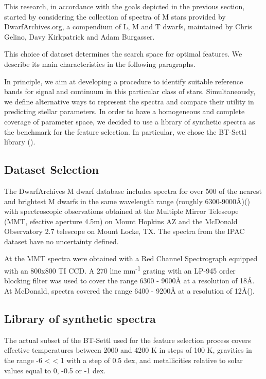 This research, in accordance with the goals depicted in the previous
  section, started by considering the collection of spectra of M stars
  provided by DwarfArchives.org, a compendium of L, M and T dwarfs,
  maintained by Chris Gelino, Davy Kirkpatrick and Adam Burgasser.

This choice of dataset determines the search space for optimal
features. We describe its main characteristics in the following
paragraphs.

In principle, we aim at developing a procedure to identify suitable
reference bands for signal and continuum in this particular class of
stars. Simultaneously, we define alternative ways to represent the
spectra and compare their utility in predicting stellar parameters. In
order to have a homogeneous and complete coverage of parameter space,
we decided to use a library of synthetic spectra as the benchmark for
the feature selection. In particular, we chose the BT-Settl library
(\cite{2013MSAIS..24..128A}). 

\subsection{Dataset Selection}
\label{subsec:DS}
 The DwarfArchives M dwarf database includes spectra for over 500 of
  the nearest and brightest M dwarfs in the same wavelength range
  (roughly 6300-9000{\AA})(\cite{Kirkpatrick:2002eh}) with
  spectroscopic observations obtained at the Multiple Mirror Telescope
  (MMT, efective aperture 4.5m) on Mount Hopkins AZ and the McDonald
  Observatory 2.7 telescope on Mount Locke, TX. The spectra from the
  IPAC dataset have no uncertainty defined.

 At the MMT spectra were obtained with a Red Channel Spectrograph
  equipped with an 800x800 TI CCD. A 270 line mm\textsuperscript{-1}
  grating with an LP-945 order blocking filter was used to cover the
  range 6300 - 9000{\AA} at a resolution of 18{\AA}. At McDonald,
  spectra covered the range 6400 - 9200{\AA} at a resolution of
  12{\AA}(\cite{1994AJ....108.1437H}).

\subsection {Library of synthetic spectra}

\label{subsec:RTL}

The actual subset of the BT-Settl used for the feature selection
process covers effective temperatures between 2000 and 4200 K in steps
of 100 K, gravities in the range -6 < \logg < 1 with a step of 0.5
dex, and metallicities relative to solar values equal to 0, -0.5 or -1
dex.

